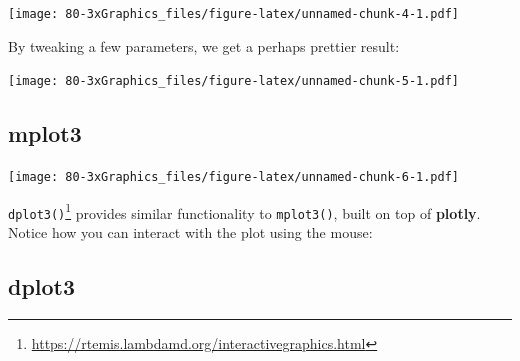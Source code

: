 \documentclass[
]{book}
\newenvironment{Shaded}{\begin{snugshade}}{\end{snugshade}}
\newcommand{\AttributeTok}[1]{\textcolor[rgb]{0.77,0.63,0.00}{#1}}
\newcommand{\DecValTok}[1]{\textcolor[rgb]{0.00,0.00,0.81}{#1}}
\newcommand{\FloatTok}[1]{\textcolor[rgb]{0.00,0.00,0.81}{#1}}
\newcommand{\FunctionTok}[1]{\textcolor[rgb]{0.00,0.00,0.00}{#1}}
\newcommand{\NormalTok}[1]{#1}
\newcommand{\SpecialCharTok}[1]{\textcolor[rgb]{0.00,0.00,0.00}{#1}}
\newcommand{\StringTok}[1]{\textcolor[rgb]{0.31,0.60,0.02}{#1}}
\DeclareRobustCommand{\href}[2]{#2\footnote{\url{#1}}}
\renewcommand{\href}[2]{#2\footnote{\url{#1}}}
\begin{document}
\texttt{[image: 80-3xGraphics\_files/figure-latex/unnamed-chunk-4-1.pdf]}

By tweaking a few parameters, we get a perhaps prettier result:

\begin{Shaded}
\end{Shaded}

\texttt{[image: 80-3xGraphics\_files/figure-latex/unnamed-chunk-5-1.pdf]}

\hypertarget{mplot3}{%
\subsection{\texorpdfstring{\textbf{mplot3}}{mplot3}}\label{mplot3}}

\begin{Shaded}
\end{Shaded}

\texttt{[image: 80-3xGraphics\_files/figure-latex/unnamed-chunk-6-1.pdf]}

\href{https://rtemis.lambdamd.org/interactivegraphics.html}{\texttt{dplot3()}} provides similar functionality to \texttt{mplot3()}, built on top of \textbf{plotly}. Notice how you can interact with the plot using the mouse:

\hypertarget{dplot3}{%
\subsection{\texorpdfstring{\textbf{dplot3}}{dplot3}}\label{dplot3}}

\begin{Shaded}
\end{Shaded}
\end{document}
